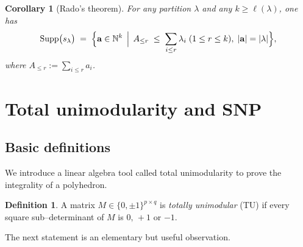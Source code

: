 \documentclass[12pt,a4paper,oneside]{amsart}
\newtheorem {corollary}[theorem]{Corollary}
\theoremstyle{definition}
\newtheorem{definition}{Definition}[section]
\DeclareMathOperator{\Supp}{Supp}
\begin{document}
\begin{corollary}[Rado's theorem]
\label{cor:support-schur}
For any partition \(\lambda\) and any \(k\ge \ell(\lambda)\), one has
\[
  \Supp\bigl(s_\lambda\bigr)
  \;=\;
  \Bigl\{\mathbf a\in\mathbb N^{k}\,\Bigm|\,
        A_{\le r}\;\le\;\sum_{i\le r}\lambda_i
        \;(1\le r\le k),\;
        |\mathbf a|=|\lambda|
  \Bigr\},
\]
where \(A_{\le r}:=\sum_{i\le r}a_i\).
\end{corollary}

\section{Total unimodularity and SNP}\label{sec:TU}
\subsection{Basic definitions}
\label{subsec:TU}
We introduce a linear algebra tool called total unimodularity to prove the integrality of a polyhedron.
\begin{definition}
A matrix $M\in\{0,\pm1\}^{p\times q}$ is
\emph{totally unimodular} (TU) if every square sub–determinant of $M$
is $0,\,+1$ or $-1$.
\end{definition}

The next statement is an elementary but useful observation.
\end{document}

